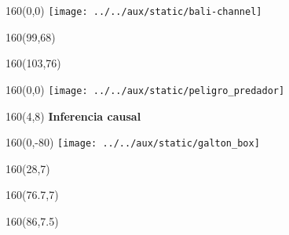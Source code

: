\documentclass[shownotes,aspectratio=169]{beamer}
\begin{document}
\begin{frame}

\begin{textblock}{160}(0,0)
\texttt{[image: ../../aux/static/bali-channel]}
\end{textblock}


\begin{textblock}{160}(99,68)
\LARGE \textcolor{black!85}{}
\end{textblock}

\begin{textblock}{160}(103,76)
\LARGE \textcolor{black!85}{}
\end{textblock}


\end{frame}


\begin{frame}

\begin{textblock}{160}(0,0)
\texttt{[image: ../../aux/static/peligro\_predador]}
\end{textblock}

\begin{textblock}{160}(4,8)
\LARGE \textcolor{black!75}{\fontsize{22}{0}\selectfont \textbf{Inferencia causal}}
\end{textblock}

\end{frame}


\begin{frame}
\begin{textblock}{160}(0,-80)  \centering
\texttt{[image: ../../aux/static/galton\_box]}
\end{textblock}

\begin{textblock}{160}(28,7)
\LARGE \textcolor{black!5}{}
\end{textblock}

\begin{textblock}{160}(76.7,7)
\LARGE \textcolor{black!95}{}
\end{textblock}

\begin{textblock}{160}(86,7.5)
\LARGE \textcolor{black!5}{}
\end{textblock}

\end{frame}
\end{document}
